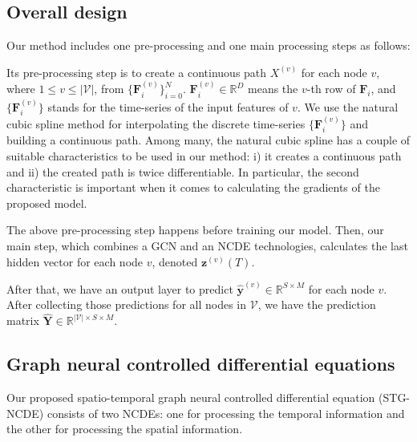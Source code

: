 \documentclass[letterpaper]{article} \usepackage{aaai22}  \usepackage{times}  \usepackage{helvet}  \usepackage{courier}  \usepackage[hyphens]{url}  \usepackage{graphicx} \urlstyle{rm} \def\UrlFont{\rm}  \usepackage{natbib}  \usepackage{caption} \DeclareCaptionStyle{ruled}{labelfont=normalfont,labelsep=colon,strut=off} \frenchspacing  \setlength{\pdfpagewidth}{8.5in}  \setlength{\pdfpageheight}{11in}  \usepackage{stfloats}
\begin{document}
\subsection{Overall design}


Our method includes one pre-processing and one main processing steps as follows:
\begin{compactenum}
    \item Its pre-processing step is to create a continuous path $X^{(v)}$ for each node $v$, where $1 \leq v \leq |\mathcal{V}|$, from $\{\bm{F}_{i}^{(v)}\}_{i=0}^{N}$. $\bm{F}_{i}^{(v)} \in \mathbb{R}^D$ means the $v$-th row of $\bm{F}_{i}$, and $\{\bm{F}_{i}^{(v)}\}$ stands for the time-series of the input features of $v$. We use the natural cubic spline method for interpolating the discrete time-series $\{\bm{F}_{i}^{(v)}\}$ and building a continuous path. Among many, the natural cubic spline has a couple of suitable characteristics to be used in our method: i) it creates a continuous path and ii) the created path is twice differentiable. In particular, the second characteristic is important when it comes to calculating the gradients of the proposed model.
    \item The above pre-processing step happens before training our model. Then, our main step, which combines a GCN and an NCDE technologies, calculates the last hidden vector for each node $v$, denoted $\bm{z}^{(v)}(T)$.
    \item After that, we have an output layer to predict $\hat{\bm{y}}^{(v)} \in \mathbb{R}^{S \times M}$ for each node $v$. After collecting those predictions for all nodes in $\mathcal{V}$, we have the prediction matrix $\hat{\bm{Y}} \in \mathbb{R}^{|\mathcal{V}| \times S \times M}$.
\end{compactenum}

\subsection{Graph neural controlled differential equations}
Our proposed spatio-temporal graph neural controlled differential equation (STG-NCDE) consists of two NCDEs: one for processing the temporal information and the other for processing the spatial information.
\end{document}
